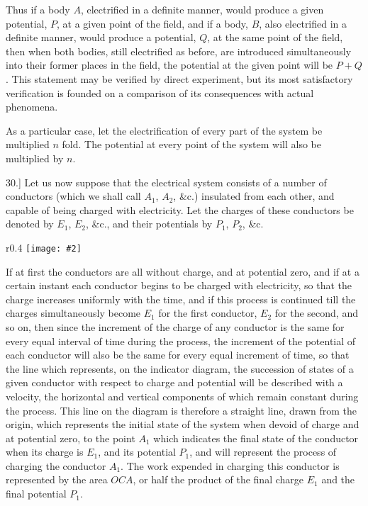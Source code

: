 \documentclass[12pt,oneside]{book}[2021/10/04]
\newcommand{\Runhead}[1]{\fancyhead[C]{\iffloatpage{}{\small#1}}}
\newcommand{\article}[1]{\phantomsection \label{art:#1}{#1.]}}
\newcommand{\wrapfig}[3]{
\begin{wrapfigure}{r}{#1\textwidth}
\centering
\texttt{[image: \#2]}
\caption*{\small #3}
\end{wrapfigure}}
\newcommand{\¬}{\hphantom{0}}
\begin{document}
\Runhead{SUPERPOSITION OF ELECTRIC EFFECTS.}
Thus if a body \(A\), electrified in a definite manner, would produce
a given potential, \(P\), at a given point of the field, and if a body, \(B\),
also electrified in a definite manner, would produce a potential, \(Q\),
at the same point of the field, then when both bodies, still electrified
as before, are introduced simultaneously into their former
places in the field, the potential at the given point will be \(P + Q\).
This statement may be verified by direct experiment, but its most
satisfactory verification is founded on a comparison of its consequences
with actual phenomena.

As a particular case, let the electrification of every part of the
system be multiplied \(n\) fold. The potential at every point of the
system will also be multiplied by \(n\).

\article{30} Let us now suppose that the electrical system consists of a
number of conductors (which we shall call \(A_1\), \(A_2\), \&c.) insulated from
each other, and capable of being charged with electricity. Let the
charges of these conductors be denoted by \(E_1\), \(E_2\), \&c., and their
potentials by \(P_1\), \(P_2\), \&c.

\wrapfig{0.4}{043.png}{Fig. 13.}
If at first the conductors are all without charge, and at potential
zero, and if at a certain instant each conductor begins to be charged
with electricity, so that the charge
increases uniformly with the time,
and if this process is continued till
the charges simultaneously become
\(E_1\) for the first conductor, \(E_2\) for the
second, and so on, then since the increment
of the charge of any conductor
is the same for every equal
interval of time during the process,
the increment of the potential of
each conductor will also be the same
for every equal increment of time, so that the line which represents,
on the indicator diagram, the succession of states of a given conductor
with respect to charge and potential will be described with
a velocity, the horizontal and vertical components of which remain
constant during the process. This line on the diagram is therefore
a straight line, drawn from the origin, which represents the initial
state of the system when devoid of charge and at potential zero, to
the point \(A_1\) which indicates the final state of the conductor when
its charge is \(E_1\), and its potential \(P_1\), and will represent the process
of charging the conductor \(A_1\). The work expended in charging
this conductor is represented by the area \(OCA\), or half the product
of the final charge \(E_1\) and the final potential \(P_1\).
\end{document}
